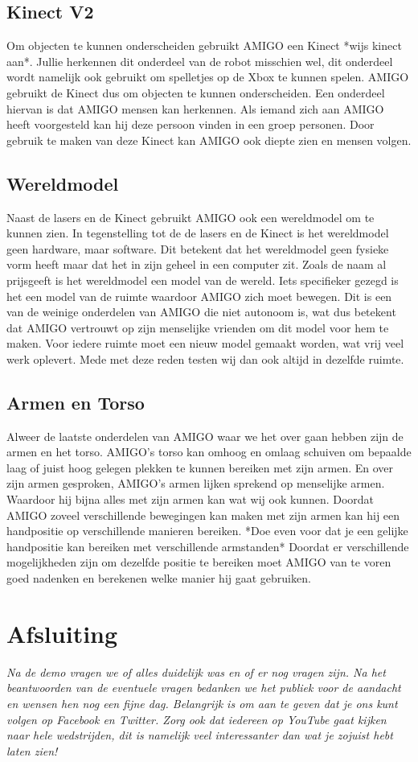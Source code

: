 \documentclass[a4paper,10pt]{article}
\numberwithin{equation}{section}
\numberwithin{figure}{section}
\numberwithin{table}{section}
\begin{document}
\subsection*{Kinect V2}
Om objecten te kunnen onderscheiden gebruikt AMIGO een Kinect *wijs kinect aan*. Jullie herkennen dit onderdeel van de robot misschien wel, dit onderdeel wordt namelijk ook gebruikt om spelletjes op de Xbox te kunnen spelen. AMIGO gebruikt de Kinect dus om objecten te kunnen onderscheiden. Een onderdeel hiervan is dat AMIGO mensen kan herkennen. Als iemand zich aan AMIGO heeft voorgesteld kan hij deze persoon vinden in een groep personen. Door gebruik te maken van deze Kinect kan AMIGO ook diepte zien en mensen volgen.

\subsection*{Wereldmodel}
Naast de lasers en de Kinect gebruikt AMIGO ook een wereldmodel om te kunnen zien. In tegenstelling tot de de lasers en de Kinect is het wereldmodel geen hardware, maar software. Dit betekent dat het wereldmodel geen fysieke vorm heeft maar dat het in zijn geheel in een computer zit. Zoals de naam al prijsgeeft is het wereldmodel een model van de wereld. Iets specifieker gezegd is het een model van de ruimte waardoor AMIGO zich moet bewegen. Dit is een van de weinige onderdelen van AMIGO die niet autonoom is, wat dus betekent dat AMIGO vertrouwt op zijn menselijke vrienden om dit model voor hem te maken. Voor iedere ruimte moet een nieuw model gemaakt worden, wat vrij veel werk oplevert. Mede met deze reden testen wij dan ook altijd in dezelfde ruimte.

\subsection*{Armen en Torso}
Alweer de laatste onderdelen van AMIGO waar we het over gaan hebben zijn de armen en het torso. AMIGO's torso kan omhoog en omlaag schuiven om bepaalde laag of juist hoog gelegen plekken te kunnen bereiken met zijn armen. En over zijn armen gesproken, AMIGO's armen lijken sprekend op menselijke armen. Waardoor hij bijna alles met zijn armen kan wat wij ook kunnen. Doordat AMIGO zoveel verschillende bewegingen kan maken met zijn armen kan hij een handpositie op verschillende manieren bereiken. *Doe even voor dat je een gelijke handpositie kan bereiken met verschillende armstanden* Doordat er verschillende mogelijkheden zijn om dezelfde positie te bereiken moet AMIGO van te voren goed nadenken en berekenen welke manier hij gaat gebruiken.
 

\section*{Afsluiting}
\textit{Na de demo vragen we of alles duidelijk was en of er nog vragen zijn. Na het beantwoorden van de eventuele vragen bedanken we het publiek voor de aandacht en wensen hen nog een fijne dag. Belangrijk is om aan te geven dat je ons kunt volgen op Facebook en Twitter. Zorg ook dat iedereen op YouTube gaat kijken naar hele wedstrijden, dit is namelijk veel interessanter dan wat je zojuist hebt laten zien!}
\end{document}
